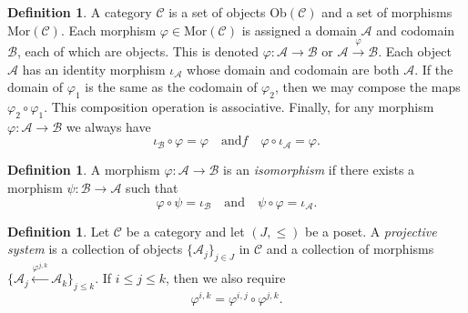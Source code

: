 \documentclass[12pt]{article}
\theoremstyle{definition}
\newtheorem{definition}[theorem]{Definition}
\newcommand{\mc}[1]{\mathcal{#1}}
\newcommand{\<}{\langle}
\renewcommand{\>}{\rangle}
\begin{document}
\begin{definition} \cite[Chapter I.2]{cats-working}
    A category $\mc C$ is a set of objects Ob$(\mc C)$ and a set of morphisms Mor$(\mc C)$. Each morphism $\varphi \in \text{Mor}(\mc C)$ is assigned a domain $\mc A$ and codomain $\mc B$, each of which are objects. This is denoted $\varphi: \mc A \to \mc B$ or $\mc A \overset{\varphi}{\to} \mc B$. Each object $\mc A$ has an identity morphism $\iota_{\mc A}$ whose domain and codomain are both $\mc A$. If the domain of $\varphi_1$ is the same as the codomain of $\varphi_2$, then we may compose the maps $\varphi_2\circ \varphi_1$. This composition operation is associative. Finally, for any morphism $\varphi: \mc A \to \mc B$ we always have
    \[
    \iota_{\mc B} \circ \varphi = \varphi \quad \text{and}f \quad \varphi \circ \iota_{\mc A} = \varphi.    
    \]
\end{definition}

\begin{definition} \cite[Chapter I.5]{cats-working}
    A morphism $\varphi: \mc A \to \mc B$ is an \textit{isomorphism} if there exists a morphism $\psi: \mc B \to \mc A$ such that 
    \[
    \varphi \circ \psi = \iota_{\mc B} \quad \text{and} \quad \psi \circ \varphi = \iota_{\mc A}.
    \]
\end{definition}

\begin{definition} \label{defn: limit}
    Let $\mc C$ be a category and let $(J, \leq)$ be a poset. A \textit{projective system} is a collection of objects $\{\mc A_j\}_{j \in J}$ in $\mc C$ and a collection of morphisms $\{\mc A_j \overset{\varphi^{j,k}}{\leftarrow} \mc A_k\}_{j \leq k}$. If $i \leq j \leq k$, then we also require 
    \[
    \varphi^{i,k} = \varphi^{i,j} \circ \varphi^{j,k}.
    \]
\end{definition}
\end{document}
